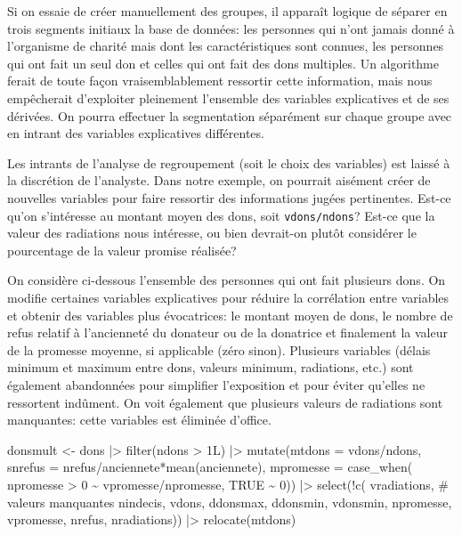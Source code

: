 \documentclass[
  11pt,
  letterpaper,
]{scrbook}
\newenvironment{Shaded}{\begin{snugshade}}{\end{snugshade}}
\newcommand{\AttributeTok}[1]{\textcolor[rgb]{0.40,0.45,0.13}{#1}}
\newcommand{\CommentTok}[1]{\textcolor[rgb]{0.37,0.37,0.37}{#1}}
\newcommand{\ConstantTok}[1]{\textcolor[rgb]{0.56,0.35,0.01}{#1}}
\newcommand{\DecValTok}[1]{\textcolor[rgb]{0.68,0.00,0.00}{#1}}
\newcommand{\FunctionTok}[1]{\textcolor[rgb]{0.28,0.35,0.67}{#1}}
\newcommand{\NormalTok}[1]{\textcolor[rgb]{0.00,0.23,0.31}{#1}}
\newcommand{\OtherTok}[1]{\textcolor[rgb]{0.00,0.23,0.31}{#1}}
\newcommand{\SpecialCharTok}[1]{\textcolor[rgb]{0.37,0.37,0.37}{#1}}
\theoremstyle{definition}
\theoremstyle{remark}
\begin{document}
Si on essaie de créer manuellement des groupes, il apparaît logique de
séparer en trois segments initiaux la base de données: les personnes qui
n'ont jamais donné à l'organisme de charité mais dont les
caractéristiques sont connues, les personnes qui ont fait un seul don et
celles qui ont fait des dons multiples. Un algorithme ferait de toute
façon vraisemblablement ressortir cette information, mais nous
empêcherait d'exploiter pleinement l'ensemble des variables explicatives
et de ses dérivées. On pourra effectuer la segmentation séparément sur
chaque groupe avec en intrant des variables explicatives différentes.

Les intrants de l'analyse de regroupement (soit le choix des variables)
est laissé à la discrétion de l'analyste. Dans notre exemple, on
pourrait aisément créer de nouvelles variables pour faire ressortir des
informations jugées pertinentes. Est-ce qu'on s'intéresse au montant
moyen des dons, soit \texttt{vdons/ndons}? Est-ce que la valeur des
radiations nous intéresse, ou bien devrait-on plutôt considérer le
pourcentage de la valeur promise réalisée?

On considère ci-dessous l'ensemble des personnes qui ont fait plusieurs
dons. On modifie certaines variables explicatives pour réduire la
corrélation entre variables et obtenir des variables plus évocatrices:
le montant moyen de dons, le nombre de refus relatif à l'ancienneté du
donateur ou de la donatrice et finalement la valeur de la promesse
moyenne, si applicable (zéro sinon). Plusieurs variables (délais minimum
et maximum entre dons, valeurs minimum, radiations, etc.) sont également
abandonnées pour simplifier l'exposition et pour éviter qu'elles ne
ressortent indûment. On voit également que plusieurs valeurs de
radiations sont manquantes: cette variables est éliminée d'office.

\begin{Shaded}
\begin{Highlighting}[]
\NormalTok{donsmult }\OtherTok{\textless{}{-}}\NormalTok{ dons }\SpecialCharTok{|\textgreater{}}
  \FunctionTok{filter}\NormalTok{(ndons }\SpecialCharTok{\textgreater{}}\NormalTok{ 1L) }\SpecialCharTok{|\textgreater{}}
  \FunctionTok{mutate}\NormalTok{(}\AttributeTok{mtdons =}\NormalTok{ vdons}\SpecialCharTok{/}\NormalTok{ndons,}
         \AttributeTok{snrefus =}\NormalTok{ nrefus}\SpecialCharTok{/}\NormalTok{anciennete}\SpecialCharTok{*}\FunctionTok{mean}\NormalTok{(anciennete),}
         \AttributeTok{mpromesse =} \FunctionTok{case\_when}\NormalTok{(}
\NormalTok{           npromesse }\SpecialCharTok{\textgreater{}} \DecValTok{0} \SpecialCharTok{\textasciitilde{}}\NormalTok{ vpromesse}\SpecialCharTok{/}\NormalTok{npromesse,}
           \ConstantTok{TRUE} \SpecialCharTok{\textasciitilde{}} \DecValTok{0}\NormalTok{)) }\SpecialCharTok{|\textgreater{}}
  \FunctionTok{select}\NormalTok{(}\SpecialCharTok{!}\FunctionTok{c}\NormalTok{(}
\NormalTok{    vradiations, }\CommentTok{\# valeurs manquantes}
\NormalTok{    nindecis, vdons, ddonsmax,}
\NormalTok{    ddonsmin, vdonsmin, npromesse,}
\NormalTok{    vpromesse, nrefus, nradiations)) }\SpecialCharTok{|\textgreater{}}
  \FunctionTok{relocate}\NormalTok{(mtdons)}
\end{Highlighting}
\end{Shaded}
\end{document}

